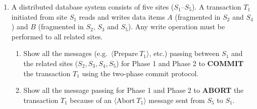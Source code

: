 \documentclass[12pt]{article}
\begin{document}
\begin{enumerate}

\item A distributed database system consists of five sites ($S_1$--$S_5$). A transaction $T_1$ initiated from site $S_1$ reads and writes data items $A$ (fragmented in $S_2$ and $S_4$) and $B$ (fragmented in $S_2$, $S_3$ and $S_5$). Any write operation must be performed to all related sites.
\begin{enumerate}
  \item Show all the messages (e.g.\ $\langle\text{Prepare}\ T_1\rangle$, etc.) passing between $S_1$ and the related sites ($S_2, S_3, S_4, S_5$) for Phase 1 and Phase 2 to \textbf{COMMIT} the transaction $T_1$ using the two-phase commit protocol.
  \item Show all the message passing for Phase 1 and Phase 2 to \textbf{ABORT} the transaction $T_1$ because of an $\langle\text{Abort}\ T_1\rangle$ message sent from $S_5$ to $S_1$.
\end{enumerate}

\begin{center}
    

\end{center}
\end{enumerate}
\end{document}
